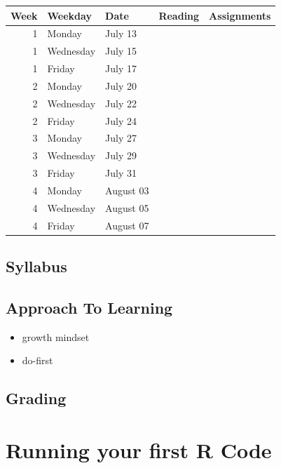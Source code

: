 \documentclass[
]{book}
\providecommand{\tightlist}{%
  \setlength{\itemsep}{0pt}\setlength{\parskip}{0pt}}
\begin{document}
\begin{table}[H]
\centering
\begin{tabular}{r|l|l|l|l}
\hline
Week & Weekday & Date & Reading & Assignments\\
\hline
1 & Monday & July 13 &  & \\
\hline
1 & Wednesday & July 15 &  & \\
\hline
1 & Friday & July 17 &  & \\
\hline
2 & Monday & July 20 &  & \\
\hline
2 & Wednesday & July 22 &  & \\
\hline
2 & Friday & July 24 &  & \\
\hline
3 & Monday & July 27 &  & \\
\hline
3 & Wednesday & July 29 &  & \\
\hline
3 & Friday & July 31 &  & \\
\hline
4 & Monday & August 03 &  & \\
\hline
4 & Wednesday & August 05 &  & \\
\hline
4 & Friday & August 07 &  & \\
\hline
\end{tabular}
\end{table}

\hypertarget{syllabus}{%
\subsection{Syllabus}\label{syllabus}}

\hypertarget{approach-to-learning}{%
\subsection{Approach To Learning}\label{approach-to-learning}}

\begin{itemize}
\tightlist
\item
  growth mindset
\item
  do-first
\end{itemize}

\hypertarget{grading}{%
\subsection{Grading}\label{grading}}

\hypertarget{running-your-first-r-code}{%
\section{Running your first R Code}\label{running-your-first-r-code}}
\end{document}
